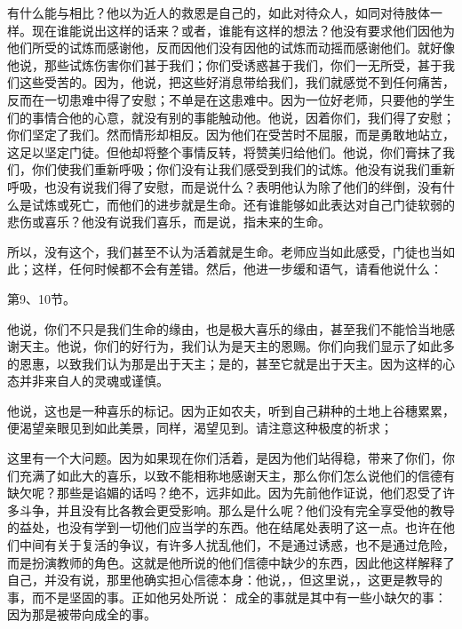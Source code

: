 有什么能与相比？他以为近人的救恩是自己的，如此对待众人，如同对待肢体一样。现在谁能说出这样的话来？或者，谁能有这样的想法？他没有要求他们因他为他们所受的试炼而感谢他，反而因他们没有因他的试炼而动摇而感谢他们。就好像他说，那些试炼伤害你们甚于我们；你们受诱惑甚于我们，你们一无所受，甚于我们这些受苦的。因为，他说，把这些好消息带给我们，我们就感觉不到任何痛苦，反而在一切患难中得了安慰；不单是在这患难中。因为一位好老师，只要他的学生们的事情合他的心意，就没有别的事能触动他。他说，因着你们，我们得了安慰；你们坚定了我们。然而情形却相反。因为他们在受苦时不屈服，而是勇敢地站立，这足以坚定门徒。但他却将整个事情反转，将赞美归给他们。他说，你们膏抹了我们，你们使我们重新呼吸；你们没有让我们感受到我们的试炼。他没有说我们重新呼吸，也没有说我们得了安慰，而是说什么？表明他认为除了他们的绊倒，没有什么是试炼或死亡，而他们的进步就是生命。还有谁能够如此表达对自己门徒软弱的悲伤或喜乐？他没有说我们喜乐，而是说，指未来的生命。\par

所以，没有这个，我们甚至不认为活着就是生命。老师应当如此感受，门徒也当如此；这样，任何时候都不会有差错。然后，他进一步缓和语气，请看他说什么：\par

第9、10节。\par

他说，你们不只是我们生命的缘由，也是极大喜乐的缘由，甚至我们不能恰当地感谢天主。他说，你们的好行为，我们认为是天主的恩赐。你们向我们显示了如此多的恩惠，以致我们认为那是出于天主；是的，甚至它就是出于天主。因为这样的心态并非来自人的灵魂或谨慎。\par

他说，这也是一种喜乐的标记。因为正如农夫，听到自己耕种的土地上谷穗累累，便渴望亲眼见到如此美景，同样，渴望见到。请注意这种极度的祈求；\par

这里有一个大问题。因为如果现在你们活着，是因为他们站得稳，带来了你们，你们充满了如此大的喜乐，以致不能相称地感谢天主，那么你们怎么说他们的信德有缺欠呢？那些是谄媚的话吗？绝不，远非如此。因为先前他作证说，他们忍受了许多斗争，并且没有比各教会更受影响。那么是什么呢？他们没有完全享受他的教导的益处，也没有学到一切他们应当学的东西。他在结尾处表明了这一点。也许在他们中间有关于复活的争议，有许多人扰乱他们，不是通过诱惑，也不是通过危险，而是扮演教师的角色。这就是他所说的他们信德中缺少的东西，因此他这样解释了自己，并没有说，那里他确实担心信德本身：他说，，但这里说，，这更是教导的事，而不是坚固的事。正如他另处所说： 成全的事就是其中有一些小缺欠的事：因为那是被带向成全的事。\par

